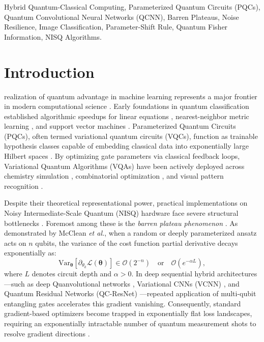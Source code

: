 \documentclass[journal]{IEEEtran}
\begin{document}
\begin{IEEEkeywords}
Hybrid Quantum-Classical Computing, Parameterized Quantum Circuits (PQCs), Quantum Convolutional Neural Networks (QCNN), Barren Plateaus, Noise Resilience, Image Classification, Parameter-Shift Rule, Quantum Fisher Information, NISQ Algorithms.
\end{IEEEkeywords}

\IEEEpeerreviewmaketitle

\section{Introduction}
 realization of quantum advantage in machine learning represents a major frontier in modern computational science \cite{biamonte2017quantum, schuld2015introduction, dunjko2018machine}. Early foundations in quantum classification established algorithmic speedups for linear equations \cite{harrow2009quantum}, nearest-neighbor metric learning \cite{wiebe2012quantum}, and support vector machines \cite{rebentrost2014quantum}. Parameterized Quantum Circuits (PQCs), often termed variational quantum circuits (VQCs), function as trainable hypothesis classes capable of embedding classical data into exponentially large Hilbert spaces \cite{havlicek2019supervised, cerezo2021variational, lloyd2020quantum}. By optimizing gate parameters via classical feedback loops, Variational Quantum Algorithms (VQAs) have been actively deployed across chemistry simulation \cite{kandala2017hardware, mcardle2020quantum, tilly2022variational}, combinatorial optimization \cite{farhi2014quantum}, and visual pattern recognition \cite{cong2019quantum, henderson2020quanvolutional}.

Despite their theoretical representational power, practical implementations on Noisy Intermediate-Scale Quantum (NISQ) hardware face severe structural bottlenecks \cite{preskill2018quantum, bharti2022noisy, fontana2025nontrivial}. Foremost among these is the \textit{barren plateau phenomenon} \cite{mcclean2018barren, cerezo2021cost, holmes2022connecting, arris2021barren}. As demonstrated by McClean \textit{et al.}, when a random or deeply parameterized ansatz acts on $n$ qubits, the variance of the cost function partial derivative decays exponentially as:
\begin{equation}
\mathrm{Var}_{\boldsymbol{\theta}}[\partial_{\theta_k} \mathcal{L}(\boldsymbol{\theta})] \in \mathcal{O}(2^{-n}) \quad \text{or} \quad \mathcal{O}(e^{-\alpha L}),
\label{eq:barren_plateau_scaling}
\end{equation}
where $L$ denotes circuit depth and $\alpha > 0$. In deep sequential hybrid architectures---such as deep Quanvolutional networks \cite{henderson2020quanvolutional}, Variational CNNs (VCNN) \cite{huang2021experimental}, and Quantum Residual Networks (QC-ResNet) \cite{shi2022quantum}---repeated application of multi-qubit entangling gates accelerates this gradient vanishing. Consequently, standard gradient-based optimizers become trapped in exponentially flat loss landscapes, requiring an exponentially intractable number of quantum measurement shots to resolve gradient directions \cite{arrasmith2021operator}.
\end{document}

